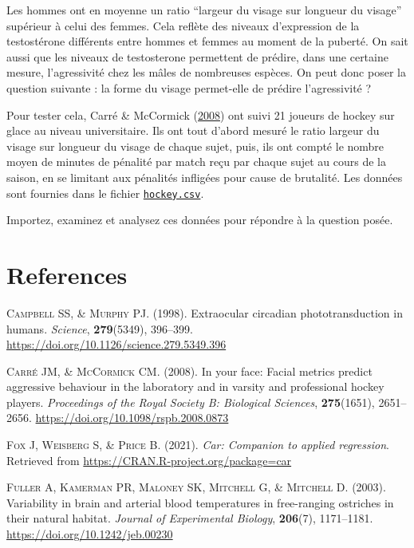 \documentclass[
  a4paper,
]{article}
\begin{document}
Les hommes ont en moyenne un ratio ``largeur du visage sur longueur du visage'' supérieur à celui des femmes. Cela reflète des niveaux d'expression de la testostérone différents entre hommes et femmes au moment de la puberté. On sait aussi que les niveaux de testosterone permettent de prédire, dans une certaine mesure, l'agressivité chez les mâles de nombreuses espèces. On peut donc poser la question suivante : la forme du visage permet-elle de prédire l'agressivité ?

Pour tester cela, Carré \& McCormick (\protect\hyperlink{ref-carre2008}{2008}) ont suivi 21 joueurs de hockey sur glace au niveau universitaire. Ils ont tout d'abord mesuré le ratio largeur du visage sur longueur du visage de chaque sujet, puis, ils ont compté le nombre moyen de minutes de pénalité par match reçu par chaque sujet au cours de la saison, en se limitant aux pénalités infligées pour cause de brutalité. Les données sont fournies dans le fichier \href{https://besibo.github.io/Biometrie3/data/hockey.csv}{\texttt{hockey.csv}}.

Importez, examinez et analysez ces données pour répondre à la question posée.

\hypertarget{references}{%
\section*{References}\label{references}}

\hypertarget{refs}{}
\leavevmode\hypertarget{ref-Campbell1998}{}%
\textsc{Campbell SS, \& Murphy PJ}. (1998). Extraocular circadian phototransduction in humans. \emph{Science}, \textbf{279}(5349), 396--399. \url{https://doi.org/10.1126/science.279.5349.396}

\leavevmode\hypertarget{ref-carre2008}{}%
\textsc{Carré JM, \& McCormick CM}. (2008). In your face: Facial metrics predict aggressive behaviour in the laboratory and in varsity and professional hockey players. \emph{Proceedings of the Royal Society B: Biological Sciences}, \textbf{275}(1651), 2651--2656. \url{https://doi.org/10.1098/rspb.2008.0873}

\leavevmode\hypertarget{ref-R-car}{}%
\textsc{Fox J, Weisberg S, \& Price B}. (2021). \emph{Car: Companion to applied regression}. Retrieved from \url{https://CRAN.R-project.org/package=car}

\leavevmode\hypertarget{ref-Fuller2003}{}%
\textsc{Fuller A, Kamerman PR, Maloney SK, Mitchell G, \& Mitchell D}. (2003). Variability in brain and arterial blood temperatures in free-ranging ostriches in their natural habitat. \emph{Journal of Experimental Biology}, \textbf{206}(7), 1171--1181. \url{https://doi.org/10.1242/jeb.00230}
\end{document}
